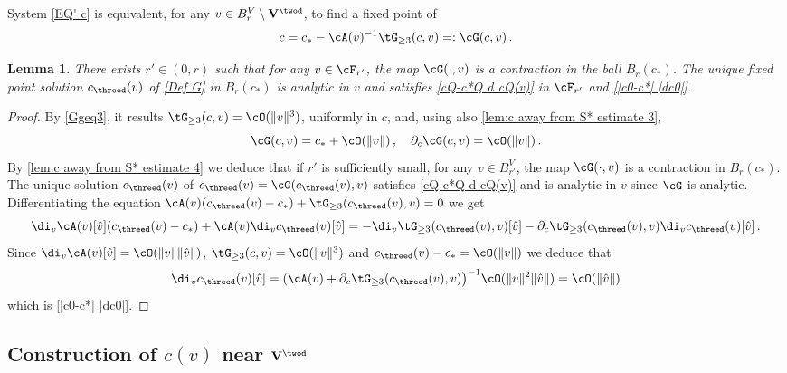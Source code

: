 \documentclass[11pt,a4paper,reqno]{article}
\numberwithin{equation}{section}
\newtheorem{lemma}[theorem]{Lemma}
\theoremstyle{definition}
\begin{document}
System \eqref{EQ' c} is  equivalent, 
for any $ v \in B_{r}^V 
\setminus {\bf V}^{\twod} $, to find a fixed point of
    \begin{equation}\label{Def G}
         c =c_* - \cA(v)^{-1}\tG_{\geq 3}(c,v)  =: \cG(c,v) \, .  
    \end{equation}

\begin{lemma}
There exists
$r'\in(0,r)$ such that for any 
$ v\in \cF_{r'} $, 
the map  $ \cG (\cdot, v) $ is a contraction in the ball
$ B_{r}(c_*) $.  
The unique fixed point solution $ c_{\threed}(v) $ of \eqref{Def G} 
in $ B_r(c_*) $ is analytic in $ v $ and 
    satisfies \eqref{cQ-c*Q d cQ(v)} in $\cF_{r'}$ and  \eqref{|c0-c*| |dc0|}. 
\end{lemma}

   
\begin{proof}
    By \eqref{Ggeq3}, it results   $\tG_{\geq 3}(c,v)=\cO(\|v\|^3)$, uniformly in $ c $, and, using also \eqref{lem:c away from S* estimate 3},  
    \begin{equation}\label{lem:c away from S* estimate 4}
        \cG(c,v)=c_*+\cO(\|v\|)\, ,\quad \partial_{c} \cG(c,v)=\cO(\|v\|)\, .
    \end{equation}
    By \eqref{lem:c away from S* estimate 4} we deduce that if $r'$ is sufficiently small, for any  $ v \in B_{r'}^V $, the map  $\cG(\cdot,v)$ is a contraction 
    in $ B_r(c_*) $.
    The unique solution $ c_{\threed}(v)$ of $
    c_{\threed}(v) = \cG(c_{\threed}(v),v) $ satisfies \eqref{cQ-c*Q d cQ(v)} and is analytic 
    in $v $ since $\cG$ is analytic. 
    Differentiating the equation $\cA(v)(c_{\threed}(v)-c_*)+\tG_{\geq 3}(c_{\threed}(v) ,v)=0$ we get
    $$
        \di_v\cA(v)[\hat v](c_{\threed}(v)-c_*)+\cA(v)\di_v c_{\threed}(v)[\hat v]
        =-\di_v\tG_{\geq 3}(c_{\threed}(v),v)[\hat v]-\partial_c\tG_{\geq 3}(c_{\threed}(v),v) \di_vc_{\threed}(v)[\hat v] \, .
    $$
    Since $\di_v\cA(v)[\hat v]=\cO(\|v\|\|\hat v\|)$, $\tG_{\geq 3}(c,v)=\cO(\|v\|^3)$ and $c_{\threed}(v)-c_*=\cO(\|v\|)$ we 
    deduce that 
    $$
        \di_vc_{\threed}(v)[\hat v]=(\cA(v)+\partial_c\tG_{\geq 3}(c_{\threed}(v),v)\big)^{-1}\cO(\|v\|^2\|\hat v\|)=\cO(\|\hat v\|) 
    $$
    which is     \eqref{|c0-c*| |dc0|}.
\end{proof}

\subsection{Construction of $ c(v) $ near $ {\bf V}^{\twod}$}
\label{sec:close}
\end{document}
